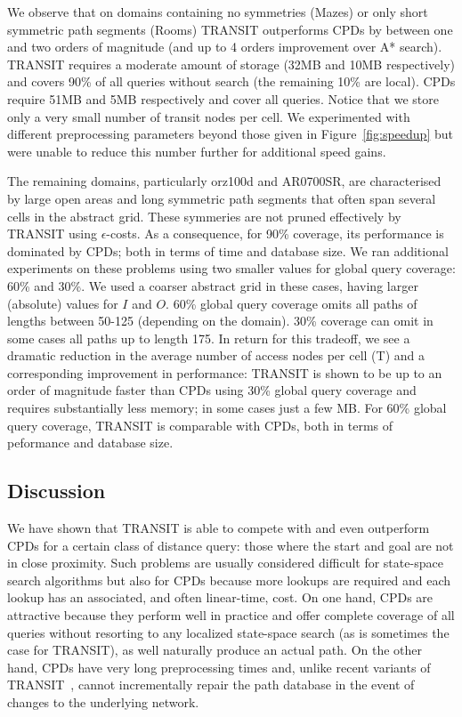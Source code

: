 We observe that on domains containing no symmetries (Mazes) or only
short symmetric path segments (Rooms) TRANSIT outperforms
CPDs by between one and two orders of magnitude (and up to 4 orders
improvement over A* search). TRANSIT requires a moderate amount of
storage (32MB and 10MB respectively) and covers 90\% of all queries without search
(the remaining 10\% are local). CPDs require 51MB and 5MB respectively
and cover all queries. Notice that we store only a very small number
of transit nodes per cell. We experimented with different preprocessing
parameters beyond those given in Figure~\ref{fig:speedup} but were unable
to reduce this number further for additional speed gains.

The remaining domains, particularly orz100d and AR0700SR, are characterised
by large open areas and long symmetric path segments that often
span several cells in the abstract grid. These symmeries
are not pruned effectively by TRANSIT using $\epsilon$-costs.
As a consequence, for 90\% coverage, its performance is dominated by CPDs;
both in terms of time and database size.
We ran additional experiments on these problems using two smaller values
for global query coverage: 60\% and 30\%. We used a coarser abstract
grid in these cases, having larger (absolute) values for $I$ and
$O$. 60\% global query coverage omits all paths of lengths
between 50-125 (depending on the domain). 30\% coverage can omit in some
cases all paths up to length 175.
In return for this tradeoff, we see a dramatic reduction in the 
average number of access nodes per cell (T) and a corresponding
improvement in performance: TRANSIT is shown to be up to an order of
magnitude faster than CPDs using 30\% global query coverage and requires
substantially less memory; in some cases just a few MB.
For 60\% global query coverage, TRANSIT is comparable with CPDs, both
in terms of peformance and database size.

\subsection{Discussion}
We have shown that TRANSIT is able to compete with and even outperform CPDs for a certain
class of distance query: those where the start and goal are not in close proximity.
Such problems are usually considered difficult for state-space search algorithms but also for CPDs because
more lookups are required and each lookup has an associated, and often linear-time, cost.
On one hand, CPDs are attractive because they perform well in practice and offer complete
coverage of all queries without resorting to any localized state-space search (as is sometimes
 the case for TRANSIT), as well naturally produce an actual path. On the other hand, CPDs have very long
 preprocessing times and, unlike recent variants of TRANSIT~\cite{verolog2012}, cannot incrementally repair 
the path database in the event of changes to the underlying network.

